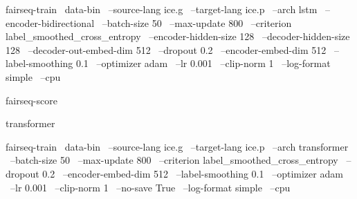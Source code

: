 fairseq-train \
    data-bin \
    --source-lang ice.g \
    --target-lang ice.p \
    --arch lstm \
    --encoder-bidirectional \
    --batch-size 50 \
    --max-update 800 \
    --criterion label_smoothed_cross_entropy \
    --encoder-hidden-size 128 \
    --decoder-hidden-size 128 \
    --decoder-out-embed-dim 512 \
    --dropout 0.2 \
    --encoder-embed-dim 512 \
    --label-smoothing 0.1 \
    --optimizer adam \
    --lr 0.001 \
    --clip-norm 1 \
    --log-format simple \
    --cpu


fairseq-score

transformer


fairseq-train \
    data-bin \
    --source-lang ice.g \
    --target-lang ice.p \
    --arch transformer \
    --batch-size 50 \
    --max-update 800 \
    --criterion label_smoothed_cross_entropy \
    --dropout 0.2 \
    --encoder-embed-dim 512 \
    --label-smoothing 0.1 \
    --optimizer adam \
    --lr 0.001 \
    --clip-norm 1 \
    --no-save True \
    --log-format simple \
    --cpu
